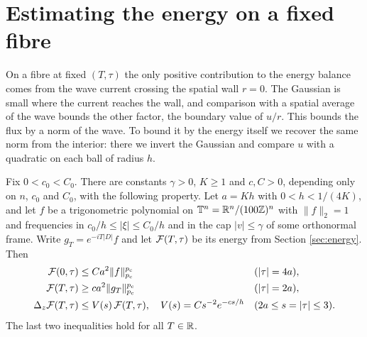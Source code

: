 \section{Estimating the energy on a fixed fibre}\label{sec:fiber}

On a fibre at fixed $(T,\tau)$ the only positive contribution to the energy balance comes from the
wave current crossing the spatial wall $r=0$. The Gaussian is small where the current reaches the
wall, and comparison with a spatial average of the wave bounds the other factor, the boundary
value of $u/r$. This bounds the flux by a norm of the wave. To bound it by the energy itself we
recover the same norm from the interior: there we invert the Gaussian and compare $u$ with a
quadratic on each ball of radius $h$.

\begin{proposition}\label{prop:fibre}
Fix $0<c_0<C_0$. There are constants $\gamma>0$, $K\ge1$ and $c,C>0$, depending only on $n$, $c_0$
and $C_0$, with the following property. Let $a=Kh$ with $0<h<1/(4K)$, and let $f$ be a
trigonometric polynomial on $\mathbb{T}^n=\mathbb{R}^n/(100\mathbb{Z})^n$ with $\|f\|_2=1$ and frequencies in
$c_0/h\le|\xi|\le C_0/h$ and in the cap $|v|\le\gamma$ of some orthonormal frame. Write
$g_T=e^{-iT|D|}f$ and let $\mathcal F(T,\tau)$ be its energy from Section \ref{sec:energy}. Then
\begin{align}
\mathcal F(0,\tau)&\le Ca^2\|f\|_{p_{\mathrm c}}^{p_{\mathrm c}}&&(|\tau|=4a),\label{eq:Fupper}\\
\mathcal F(T,\tau)&\ge ca^2\|g_T\|_{p_{\mathrm c}}^{p_{\mathrm c}}&&(|\tau|=2a),\label{eq:Flower}\\
\Delta_z\mathcal F(T,\tau)&\le V(s)\,\mathcal F(T,\tau),\quad V(s)=Cs^{-2}e^{-cs/h}&&(2a\le s=|\tau|\le3).\label{eq:Fsuper}
\end{align}
The last two inequalities hold for all $T\in\mathbb{R}$.
\end{proposition}


